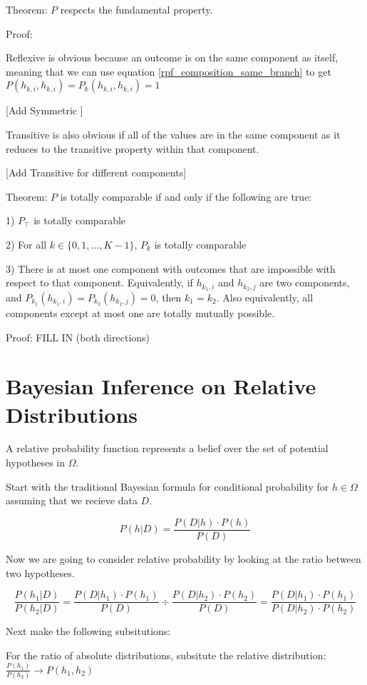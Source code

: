 \documentclass[twoside]{article}
\theoremstyle{plain}%
\theoremstyle{definition}
\theoremstyle{remark}
\begin{document}
Theorem: \(P\) respects the fundamental property.

Proof:

Reflexive is obvious because an outcome is on the same component as itself, meaning that we can use equation \ref{rpf_composition_same_branch} to get \(P(h_{k, i}, h_{k, i}) = P_k(h_{k, i}, h_{k, i}) = 1\)

[Add Symmetric ]

Transitive is also obvious if all of the values are in the same component as it reduces to the transitive property within that component.

[Add Transitive for different components]

Theorem: \(P\) is totally comparable if and only if the following are true:

1) \(P_{\top}\) is totally comparable

2) For all \(k \in \{0, 1, ..., K - 1\}\), \(P_k\) is totally comparable

3) There is at most one component with outcomes that are impossible with respect to that component. Equivalently, if \(h_{k_1, i}\) and \(h_{k_2, j}\) are two components, and \(P_{k_1}(h_{k_1, i}) = P_{k_2}(h_{k_2, j}) = 0\), then \(k_1 = k_2\). Also equivalently, all components except at most one are totally mutually possible.

Proof: FILL IN (both directions)



\section{Bayesian Inference on Relative Distributions}

A relative probability function represents a belief over the set of potential hypotheses in \(\Omega\).

Start with the traditional Bayesian formula for conditional probability for \(h \in \Omega\) assuming that we recieve data \(D\).

\[P(h|D) = \frac{P(D|h) \cdot P(h)}{P(D)}\]

Now we are going to consider relative probability by looking at the ratio between two hypotheses.

\[\frac{P(h_1|D)}{P(h_2| D)} = \frac{P(D|h_1) \cdot P(h_1)}{P(D)} \div \frac{P(D|h_2) \cdot P(h_2)}{P(D)} = \frac{P(D|h_1) \cdot P(h_1)}{P(D|h_2) \cdot P(h_2)} \]

Next make the following subsitutions:

For the ratio of absolute distributions, subsitute the relative distribution: \(\frac{P(h_1)}{P(h_2)} \rightarrow P(h_1, h_2) \)
\end{document}
